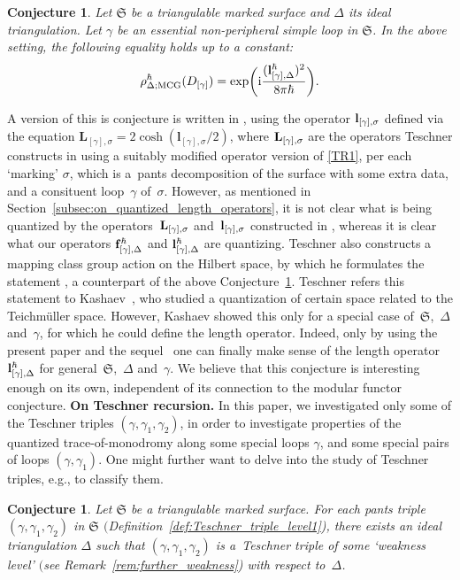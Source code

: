 \documentclass[pdftex]{sigma}
\numberwithin{equation}{section}
\newtheorem{Conjecture}[Theorem]{Conjecture}
\theoremstyle{definition}
\begin{document}
\begin{Conjecture}
\label{conjecture:Dehn}
Let $\mathfrak{S}$ be a triangulable marked surface and $\Delta$ its ideal triangulation. Let $\gamma$ be an essential non-peripheral simple loop in $\mathfrak{S}$. In the above setting, the following equality holds up to a constant:
\[
\rho^\hbar_{\Delta;{\rm MCG}} (D_{[\gamma]}) = \exp\biggl( {\rm i} \frac{ ({\bf l}^\hbar_{[\gamma],\Delta})^2 }{8\pi \hbar} \biggr).
\]
\end{Conjecture}
A version of this is conjecture is written in \cite[Proposition~12]{T}, using the operator ${\bf l}_{[\gamma],\sigma}$ defined via the equation $\mathbf{L}_{[\gamma],\sigma} = 2 \cosh(\mathbf{l}_{[\gamma],\sigma}/2)$, where ${\bf L}_{[\gamma],\sigma}$ are the operators Teschner constructs in \cite{T} using a suitably modified operator version of \ref{TR1}, per each `marking' $\sigma$, which is a~pants decomposition of the surface with some extra data, and a consituent loop~$\gamma$ of~$\sigma$. However, as mentioned in Section~\ref{subsec:on_quantized_length_operators}, it is not clear what is being quantized by the operators~${\bf L}_{[\gamma],\sigma}$ and~${\bf l}_{[\gamma],\sigma}$ constructed in \cite{T}, whereas it is clear what our operators ${\bf f}^\hbar_{[\gamma],\Delta}$ and ${\bf l}^\hbar_{[\gamma],\Delta}$ are quantizing.
Teschner also constructs a mapping class group action on the Hilbert space, by which he formulates the statement \cite[Proposition~12]{T}, a counterpart of the above Conjecture~\ref{conjecture:Dehn}.
Teschner refers this statement to Kashaev~\cite{Kash00}, who studied a quantization of certain space related to the Teichm\"uller space. However, Kashaev showed this only for a special case of~$\mathfrak{S}$,~$\Delta$ and~$\gamma$, for which he could define the length operator. Indeed, only by using the present paper and the sequel~\cite{sequel} one can finally make sense of the length operator ${\bf l}^\hbar_{[\gamma],\Delta}$ for general~$\mathfrak{S}$,~$\Delta$ and~$\gamma$. We believe that this conjecture is interesting enough on its own, independent of its connection to the modular functor conjecture.
{\bf On Teschner recursion.}
In this paper, we investigated only some of the Teschner triples $(\gamma,\gamma_1,\gamma_2)$, in order to investigate properties of the quantized trace-of-monodromy along some special loops $\gamma$, and some special pairs of loops $(\gamma,\gamma_1)$. One might further want to delve into the study of Teschner triples, e.g., to classify them.
\begin{Conjecture}
Let $\mathfrak{S}$ be a triangulable marked surface. For {\em each} pants triple $(\gamma,\gamma_1,\gamma_2)$ in $\mathfrak{S}$ $($Definition~{\rm \ref{def:Teschner_triple_level1})}, there exists an ideal triangulation $\Delta$ such that $(\gamma,\gamma_1,\gamma_2)$ is a~Teschner triple of some `weakness level' $($see Remark~{\rm \ref{rem:further_weakness})} with respect to~$\Delta$.
\end{Conjecture}
\end{document}
